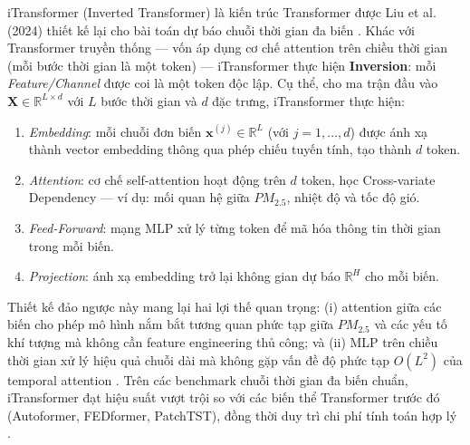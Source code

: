 iTransformer (Inverted Transformer) là kiến trúc Transformer được Liu et al. (2024) thiết kế lại cho bài toán dự báo chuỗi thời gian đa biến \cite{liu2024itransformer}. Khác với Transformer truyền thống — vốn áp dụng cơ chế attention trên chiều thời gian (mỗi bước thời gian là một token) — iTransformer thực hiện \textbf{Inversion}: mỗi \textit{Feature/Channel} được coi là một token độc lập. Cụ thể, cho ma trận đầu vào $\mathbf{X} \in \mathbb{R}^{L \times d}$ với $L$ bước thời gian và $d$ đặc trưng, iTransformer thực hiện:
\begin{enumerate}
    \item \textit{Embedding}: mỗi chuỗi đơn biến $\mathbf{x}^{(j)} \in \mathbb{R}^{L}$ (với $j = 1, \ldots, d$) được ánh xạ thành vector embedding thông qua phép chiếu tuyến tính, tạo thành $d$ token.
    \item \textit{Attention}: cơ chế self-attention hoạt động trên $d$ token, học Cross-variate Dependency — ví dụ: mối quan hệ giữa $PM_{2.5}$, nhiệt độ và tốc độ gió.
    \item \textit{Feed-Forward}: mạng MLP xử lý từng token để mã hóa thông tin thời gian trong mỗi biến.
    \item \textit{Projection}: ánh xạ embedding trở lại không gian dự báo $\mathbb{R}^{H}$ cho mỗi biến.
\end{enumerate}
Thiết kế đảo ngược này mang lại hai lợi thế quan trọng: (i) attention giữa các biến cho phép mô hình nắm bắt tương quan phức tạp giữa $PM_{2.5}$ và các yếu tố khí tượng mà không cần feature engineering thủ công; và (ii) MLP trên chiều thời gian xử lý hiệu quả chuỗi dài mà không gặp vấn đề độ phức tạp $O(L^2)$ của temporal attention \cite{liu2024itransformer}. Trên các benchmark chuỗi thời gian đa biến chuẩn, iTransformer đạt hiệu suất vượt trội so với các biến thể Transformer trước đó (Autoformer, FEDformer, PatchTST), đồng thời duy trì chi phí tính toán hợp lý \cite{liu2024itransformer}.


